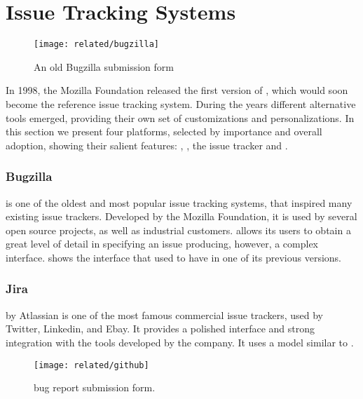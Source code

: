 \section{Issue Tracking Systems}\label{sec:related-bugtrackers}

\begin{figure}[t]
\centering
  \texttt{[image: related/bugzilla]}
  \caption{An old Bugzilla submission form}
  \label{fig:bugzilla-interface}
\end{figure}

In 1998, the Mozilla Foundation released the first version of \bzilla, which would soon become the reference issue tracking system.
During the years different alternative tools emerged, providing their own set of customizations and personalizations.
In this section we present four platforms, selected by importance and overall adoption, showing their salient features: \bzilla, \jira, the \gth issue tracker and \fbz.


\subsubsection{Bugzilla}
\bzilla{} is one of the oldest and most popular issue tracking systems, that inspired many existing issue trackers. Developed by the Mozilla Foundation, it is used by several open source projects, as well as industrial customers. \bzilla allows its users to obtain a great level of detail in specifying an issue producing, however, a complex interface.
 shows the interface that \bzilla used to have in one of its previous versions.


\subsubsection{Jira}
\jira{} by Atlassian is one of the most famous commercial issue trackers, used by Twitter, Linkedin, and Ebay. It provides a polished interface and strong integration with the tools developed by the company. It uses a model similar to \bzilla.

\begin{figure}[t]
\centering
 \texttt{[image: related/github]}
 \caption{\gth bug report submission form.}
 \label{fig:github-interface}
\end{figure}

